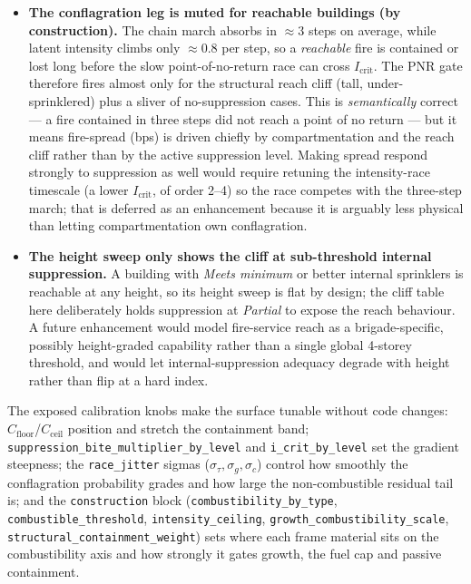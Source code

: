 \documentclass[11pt,a4paper]{article}
\begin{document}
\begin{itemize}
  \item \textbf{The conflagration leg is muted for reachable buildings (by
        construction).} The chain march absorbs in $\approx 3$ steps on average,
        while latent intensity climbs only $\approx 0.8$ per step, so a
        \emph{reachable} fire is contained or lost long before the slow
        point-of-no-return race can cross $I_{\text{crit}}$. The PNR gate
        therefore fires almost only for the structural reach cliff (tall,
        under-sprinklered) plus a sliver of no-suppression cases. This is
        \emph{semantically} correct --- a fire contained in three steps did not
        reach a point of no return --- but it means fire-spread (bps) is driven
        chiefly by compartmentation and the reach cliff rather than by the active
        suppression level. Making spread respond strongly to suppression as well
        would require retuning the intensity-race timescale (a lower
        $I_{\text{crit}}$, of order 2--4) so the race competes with the
        three-step march; that is deferred as an enhancement because it is
        arguably less physical than letting compartmentation own conflagration.
  \item \textbf{The height sweep only shows the cliff at sub-threshold internal
        suppression.} A building with \emph{Meets minimum} or better internal
        sprinklers is reachable at any height, so its height sweep is flat by
        design; the cliff table here deliberately holds suppression at
        \emph{Partial} to expose the reach behaviour. A future enhancement would
        model fire-service reach as a brigade-specific, possibly height-graded
        capability rather than a single global 4-storey threshold, and would let
        internal-suppression adequacy degrade with height rather than flip at a
        hard index.
\end{itemize}

The exposed calibration knobs make the surface tunable without code changes:
$C_{\text{floor}}$/$C_{\text{ceil}}$ position and stretch the containment band;
\texttt{suppression\_bite\_multiplier\_by\_level} and \texttt{i\_crit\_by\_level}
set the gradient steepness; the \texttt{race\_jitter} sigmas
($\sigma_\tau,\sigma_g,\sigma_c$) control how smoothly the conflagration
probability grades and how large the non-combustible residual tail is; and the
\texttt{construction} block (\texttt{combustibility\_by\_type},
\texttt{combustible\_threshold}, \texttt{intensity\_ceiling},
\texttt{growth\_combustibility\_scale}, \texttt{structural\_containment\_weight})
sets where each frame material sits on the combustibility axis and how strongly
it gates growth, the fuel cap and passive containment.
\end{document}
